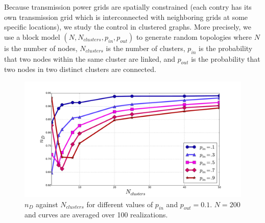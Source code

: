 \documentclass[conference]{IEEEtran}
\begin{document}
Because transmission power grids are spatially constrained (each contry has its own transmission grid which is interconnected with neighboring grids at some specific locations), we study the control in clustered graphs. More precisely, we use a block model $(N, N_{clusters}, p_{in}, p_{out} ) $ to generate random topologies where $ N $ is the number of nodes, $N_{clusters} $ is the number of clusters, $p_{in} $ is the probability that two nodes within the same cluster are linked, and $ p_{out} $ is the probability that two nodes in two distinct clusters are connected.

\begin{figure}
\includegraphics[scale=.25]{./figure_5/figure_5}
\caption{$n_D$ against $N_{clusters} $ for different values of $ p_{in} $ and $ p_{out} = 0.1 $. $ N=200 $ and curves are averaged over 100 realizations.}
\label{fig:block_model_1}
\end{figure}
\end{document}
